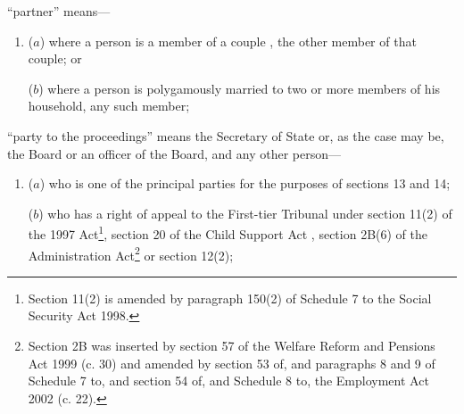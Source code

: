 \documentclass[12pt,a4paper]{article}
\begin{document}
\begin{enumerate}


“partner” means—
\begin{enumerate}\item[]
    ($a$) 
    where a person is a member of 
a couple%
, the other member of that couple; or

    ($b$) 
    where a person is polygamously married to two or more members of his household, any such member;
\end{enumerate}

“party to the proceedings” means the Secretary of State 
or, as the case may be, the Board or an officer of the Board,  %
and any other person—
\begin{enumerate}\item[]
($a$) who is one of the principal parties for the purposes of sections 13 and 14;

($b$) who has a right of appeal to 
the First-tier Tribunal  %
under section 11(2) of the 1997 Act\footnote{\frenchspacing Section 11(2) is amended by paragraph 150(2) of Schedule 7 to the Social Security Act 1998.}, section 20 of the Child Support Act%
, section 2B(6) of the Administration Act\footnote{Section 2B was inserted by section 57 of the Welfare Reform and Pensions Act 1999 (c. 30) and amended by section 53 of, and paragraphs 8 and 9 of Schedule 7 to, and section 54 of, and Schedule 8 to, the Employment Act 2002 (c. 22).}  %
or section 12(2);
\end{enumerate}


\end{enumerate}
\end{document}
